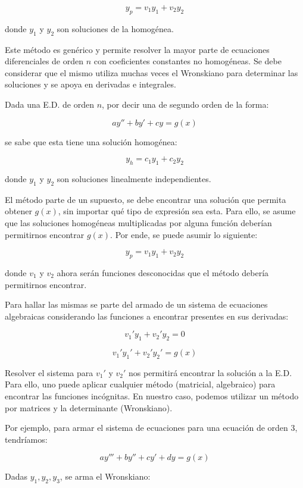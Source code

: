 \begin{equation}
y_p = v_1 y_1 + v_2 y_2
\end{equation}

donde \( y_1 \) y \( y_2 \) son soluciones de la homogénea.


Este método es genérico y permite resolver la mayor parte de ecuaciones diferenciales de orden \( n \) con coeficientes constantes no homogéneas. Se debe considerar que el mismo utiliza muchas veces el Wronskiano para determinar las soluciones y se apoya en derivadas e integrales.

Dada una E.D. de orden \( n \), por decir una de segundo orden de la forma:

\[
ay'' + by' + cy = g(x)
\]

se sabe que esta tiene una solución homogénea:

\[
y_h = c_1 y_1 + c_2 y_2
\]

donde \( y_1 \) y \( y_2 \) son soluciones linealmente independientes.

El método parte de un supuesto, se debe encontrar una solución que permita obtener \( g(x) \), sin importar qué tipo de expresión sea esta. Para ello, se asume que las soluciones homogéneas multiplicadas por alguna función deberían permitirnos encontrar \( g(x) \). Por ende, se puede asumir lo siguiente:

\[
y_p = v_1 y_1 + v_2 y_2
\]

donde \( v_1 \) y \( v_2 \) ahora serán funciones desconocidas que el método debería permitirnos encontrar.

Para hallar las mismas se parte del armado de un sistema de ecuaciones algebraicas considerando las funciones a encontrar presentes en sus derivadas:

\[
v_1' y_1 + v_2' y_2 = 0
\]

\[
v_1' y_1' + v_2' y_2' = g(x)
\]

Resolver el sistema para \( v_1' \) y \( v_2' \) nos permitirá encontrar la solución a la E.D. Para ello, uno puede aplicar cualquier método (matricial, algebraico) para encontrar las funciones incógnitas. En nuestro caso, podemos utilizar un método por matrices y la determinante (Wronskiano).

Por ejemplo, para armar el sistema de ecuaciones para una ecuación de orden 3, tendríamos:

\[
ay''' + by'' + cy' + dy = g(x)
\]

Dadas \( y_1, y_2, y_3 \), se arma el Wronskiano:

